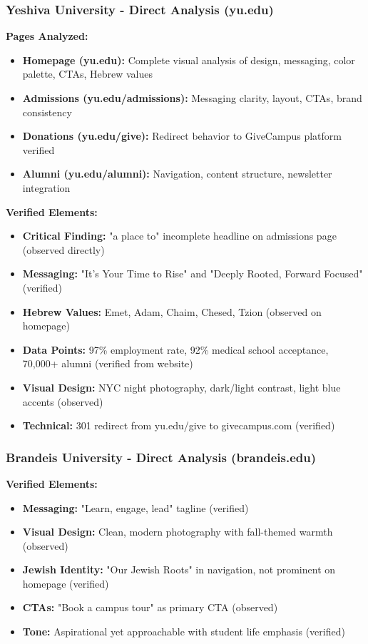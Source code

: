 \documentclass[12pt,letterpaper]{article}
\begin{document}
\subsubsection{Yeshiva University - Direct Analysis (yu.edu)}

\textbf{Pages Analyzed:}
\begin{itemize}[leftmargin=*]
    \item \textbf{Homepage (yu.edu):} Complete visual analysis of design, messaging, color palette, CTAs, Hebrew values
    \item \textbf{Admissions (yu.edu/admissions):} Messaging clarity, layout, CTAs, brand consistency
    \item \textbf{Donations (yu.edu/give):} Redirect behavior to GiveCampus platform verified
    \item \textbf{Alumni (yu.edu/alumni):} Navigation, content structure, newsletter integration
\end{itemize}

\textbf{Verified Elements:}
\begin{itemize}[leftmargin=*]
    \item \textbf{Critical Finding:} "a place to" incomplete headline on admissions page (observed directly)
    \item \textbf{Messaging:} "It's Your Time to Rise" and "Deeply Rooted, Forward Focused" (verified)
    \item \textbf{Hebrew Values:} Emet, Adam, Chaim, Chesed, Tzion (observed on homepage)
    \item \textbf{Data Points:} 97\% employment rate, 92\% medical school acceptance, 70,000+ alumni (verified from website)
    \item \textbf{Visual Design:} NYC night photography, dark/light contrast, light blue accents (observed)
    \item \textbf{Technical:} 301 redirect from yu.edu/give to givecampus.com (verified)
\end{itemize}

\subsubsection{Brandeis University - Direct Analysis (brandeis.edu)}

\textbf{Verified Elements:}
\begin{itemize}[leftmargin=*]
    \item \textbf{Messaging:} "Learn, engage, lead" tagline (verified)
    \item \textbf{Visual Design:} Clean, modern photography with fall-themed warmth (observed)
    \item \textbf{Jewish Identity:} "Our Jewish Roots" in navigation, not prominent on homepage (verified)
    \item \textbf{CTAs:} "Book a campus tour" as primary CTA (observed)
    \item \textbf{Tone:} Aspirational yet approachable with student life emphasis (verified)
\end{itemize}
\end{document}
